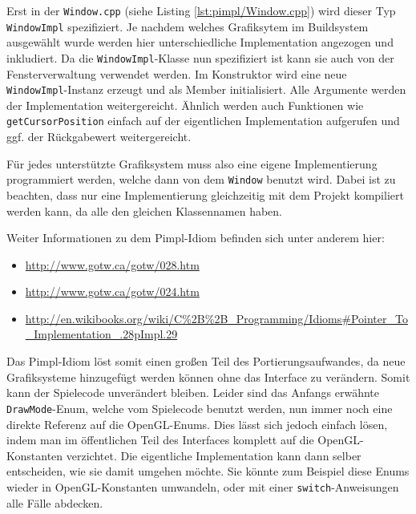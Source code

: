 \documentclass[12pt, a4paper, titlepage, hidelinks]{scrreprt}
\begin{document}
Erst in der \texttt{Window.cpp} (siehe Listing \autoref{lst:pimpl/Window.cpp}) wird dieser Typ \texttt{WindowImpl} spezifiziert. Je nachdem welches Grafiksytem im Buildsystem ausgewählt wurde werden hier unterschiedliche Implementation angezogen und inkludiert. Da die \texttt{WindowImpl}-Klasse nun spezifiziert ist kann sie auch von der Fensterverwaltung verwendet werden. Im Konstruktor wird eine neue \texttt{WindowImpl}-Instanz erzeugt und als Member initialisiert. Alle Argumente werden der Implementation weitergereicht. Ähnlich werden auch Funktionen wie \texttt{getCursorPosition} einfach auf der eigentlichen Implementation aufgerufen und ggf. der Rückgabewert weitergereicht.


Für jedes unterstützte Grafiksystem muss also eine eigene Implementierung programmiert werden, welche dann von dem \texttt{Window} benutzt wird. Dabei ist zu beachten, dass nur eine Implementierung gleichzeitig mit dem Projekt kompiliert werden kann, da alle den gleichen Klassennamen haben.


Weiter Informationen zu dem Pimpl-Idiom befinden sich unter anderem hier:
\begin{itemize}
\item \url{http://www.gotw.ca/gotw/028.htm}
\item \url{http://www.gotw.ca/gotw/024.htm}
\item \url{http://en.wikibooks.org/wiki/C%2B%2B_Programming/Idioms#Pointer_To_Implementation_.28pImpl.29}
\end{itemize}

Das Pimpl-Idiom löst somit einen großen Teil des Portierungsaufwandes, da neue Grafiksysteme hinzugefügt werden können ohne das Interface zu verändern. Somit kann der Spielecode unverändert bleiben. Leider sind das Anfangs erwähnte \texttt{DrawMode}-Enum, welche vom Spielecode benutzt werden, nun immer noch eine direkte Referenz auf die OpenGL-Enums. Dies lässt sich jedoch einfach lösen, indem man im öffentlichen Teil des Interfaces komplett auf die OpenGL-Konstanten verzichtet. Die eigentliche Implementation kann dann selber entscheiden, wie sie damit umgehen möchte. Sie könnte zum Beispiel diese Enums wieder in OpenGL-Konstanten umwandeln, oder mit einer \texttt{switch}-Anweisungen alle Fälle abdecken. 
\end{document}
